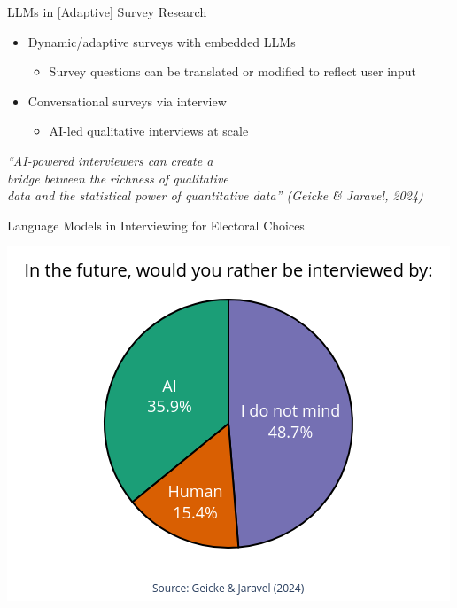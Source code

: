 \documentclass[10pt,aspectratio=169]{beamer}
\begin{document}
\begin{frame}{LLMs in [Adaptive] Survey Research}


\begin{itemize}
    \item Dynamic/adaptive surveys with embedded LLMs \textcolor{gray}{\small \citep{velez2024confronting}}
    \begin{itemize}
        \item Survey questions can be translated or modified to reflect user input  
    \end{itemize}
    \item Conversational surveys via interview \textcolor{gray}{\small \citep{geiecke2024conversations}} 
    \begin{itemize}
        \item AI-led qualitative interviews at scale 
    \end{itemize}
\end{itemize}    

\begin{tcolorbox}[quotestyle]
        \textit{``AI-powered interviewers can create a\\ bridge between the richness of qualitative\\ data and the statistical power of quantitative data'' (Geicke \& Jaravel, 2024)}
    \end{tcolorbox}

\end{frame}





\begin{frame}{Language Models in Interviewing for Electoral Choices}
	
	\begin{center}
		\includegraphics[width=.5\textwidth]{figures/piechart.png}
\end{center}
\end{frame}
\end{document}
